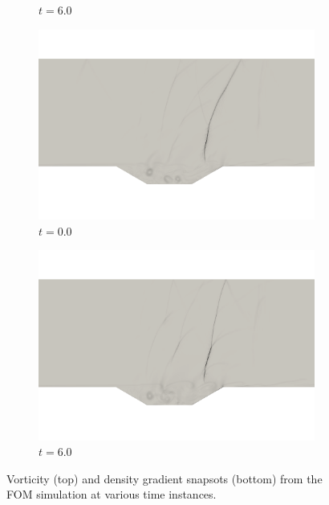 \begin{figure}
\begin{center}
\begin{subfigure}[t]{0.49\textwidth}
\caption{$t=6.0$}
\end{subfigure}
\begin{subfigure}[t]{0.49\textwidth}
\includegraphics[trim={15cm 7cm 16cm 20cm},clip,width=1.0\linewidth]{figs/cavity_new/dense_anim0000.png}
\caption{$t=0.0$}
\end{subfigure}
\begin{subfigure}[t]{0.49\textwidth}
\includegraphics[trim={15cm 7cm 16cm 20cm},clip,width=1.0\linewidth]{figs/cavity_new/dense_anim0030.png}
\caption{$t=6.0$}
\end{subfigure}
\caption{Vorticity (top) and density gradient snapsots (bottom) from the FOM simulation at various time instances.} 
\label{fig:fom_sols_cav}
\end{center}
\end{figure}



